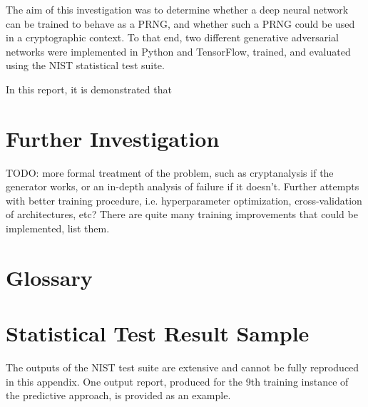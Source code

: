 \documentclass[12pt, titlepage]{report}
\theoremstyle{definition}
\begin{document}
The aim of this investigation was to determine whether a deep neural network can be trained to behave as a PRNG, and whether such a PRNG could be used in a cryptographic context. To that end, two different generative adversarial networks were implemented in Python and TensorFlow, trained, and evaluated using the NIST statistical test suite.

In this report, it is demonstrated that 






\chapter{Further Investigation}
TODO: more formal treatment of the problem, such as cryptanalysis if the generator works, or an in-depth analysis of failure if it doesn't. Further attempts with better training procedure, i.e. hyperparameter optimization, cross-validation of architectures, etc? There are quite many training improvements that could be implemented, list them.










\appendix
\chapter{Glossary}



\chapter{Statistical Test Result Sample}
The outputs of the NIST test suite are extensive and cannot be fully reproduced in this appendix. One output report, produced for the 9th training instance of the predictive approach, is provided as an example.
\end{document}
